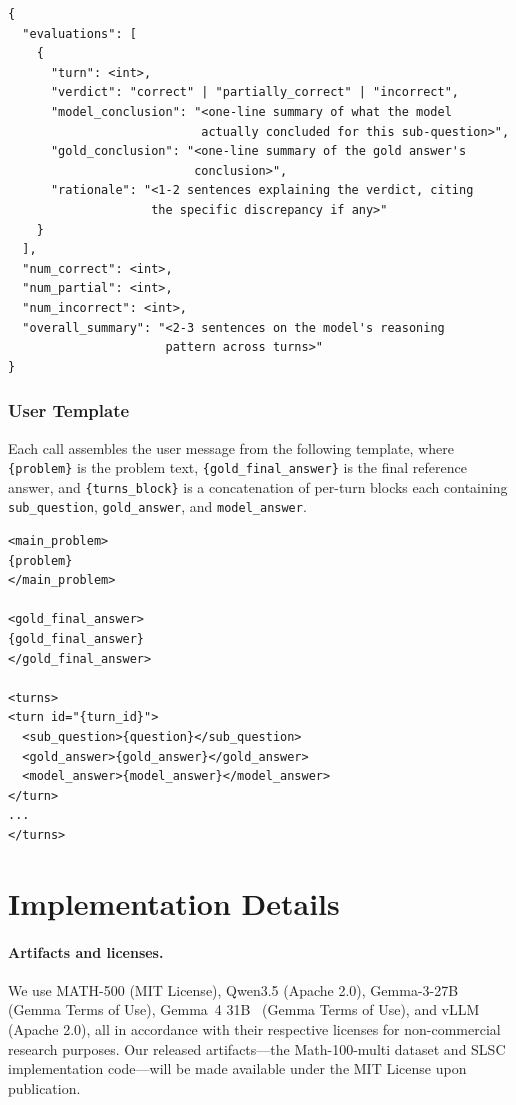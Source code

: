 \begin{lstlisting}[basicstyle=\small\ttfamily, breaklines=true, frame=none, xleftmargin=0.5em, xrightmargin=0.5em]
{
  "evaluations": [
    {
      "turn": <int>,
      "verdict": "correct" | "partially_correct" | "incorrect",
      "model_conclusion": "<one-line summary of what the model
                           actually concluded for this sub-question>",
      "gold_conclusion": "<one-line summary of the gold answer's
                          conclusion>",
      "rationale": "<1-2 sentences explaining the verdict, citing
                    the specific discrepancy if any>"
    }
  ],
  "num_correct": <int>,
  "num_partial": <int>,
  "num_incorrect": <int>,
  "overall_summary": "<2-3 sentences on the model's reasoning
                      pattern across turns>"
}
\end{lstlisting}

\subsubsection*{User Template}

Each call assembles the user message from the following template, where \texttt{\{problem\}} is the problem text, \texttt{\{gold\_final\_answer\}} is the final reference answer, and \texttt{\{turns\_block\}} is a concatenation of per-turn blocks each containing \texttt{sub\_question}, \texttt{gold\_answer}, and \texttt{model\_answer}.

\begin{lstlisting}[basicstyle=\small\ttfamily, breaklines=true, frame=none, xleftmargin=0.5em, xrightmargin=0.5em]
<main_problem>
{problem}
</main_problem>

<gold_final_answer>
{gold_final_answer}
</gold_final_answer>

<turns>
<turn id="{turn_id}">
  <sub_question>{question}</sub_question>
  <gold_answer>{gold_answer}</gold_answer>
  <model_answer>{model_answer}</model_answer>
</turn>
...
</turns>
\end{lstlisting}

\section{Implementation Details}
\label{app:implementation}

\paragraph{Artifacts and licenses.}
We use MATH-500 (MIT License), Qwen3.5 (Apache 2.0), Gemma-3-27B~\citep{gemmateam2025gemma3} (Gemma Terms of Use), Gemma~4 31B~\citep{gemmateam2026gemma4} (Gemma Terms of Use), and vLLM~\citep{kwon2023efficient} (Apache 2.0), all in accordance with their respective licenses for non-commercial research purposes. Our released artifacts---the Math-100-multi dataset and SLSC implementation code---will be made available under the MIT License upon publication.

